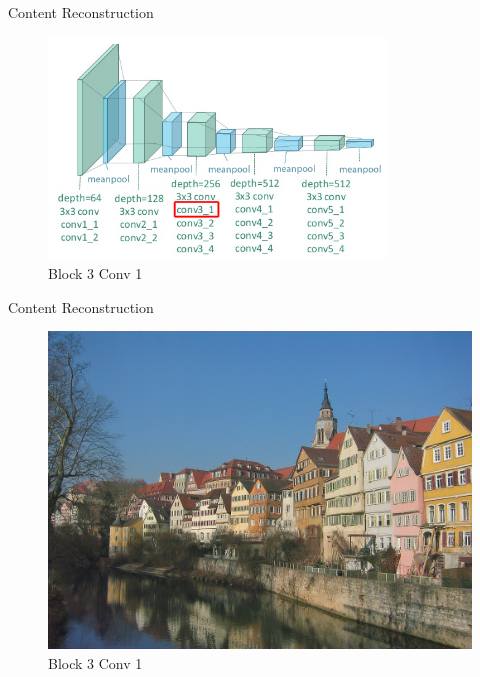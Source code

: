 \documentclass{beamer}
\begin{document}
\begin{frame}{Content Reconstruction}
\begin{figure}[ht]
\centering
\includegraphics[width=0.8\textwidth]{img/vgg19/content/block3_conv1}
\caption*{Block 3 Conv 1}
\end{figure}
\end{frame}
\begin{frame}{Content Reconstruction}
\begin{figure}[ht]
\centering
\includegraphics[width=.8\textwidth]{img/content/block3_conv1}
\caption*{Block 3 Conv 1}
\end{figure}
\end{frame}
\end{document}
